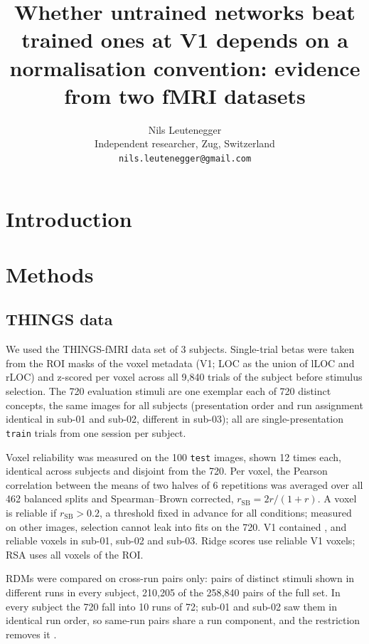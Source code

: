 \documentclass[10pt]{article}
\title{Whether untrained networks beat trained ones at V1 depends on a normalisation convention: evidence from two fMRI datasets}
\author{Nils Leutenegger\\Independent researcher, Zug, Switzerland\\\texttt{nils.leutenegger@gmail.com}}
\date{}
\begin{document}
\maketitle

\begin{abstract}

\end{abstract}

\section{Introduction}


\section{Methods}
\subsection{THINGS data}
\label{sec:data}

We used the THINGS-fMRI data set \citep{hebart2023} of 3 subjects. Single-trial
betas were taken from the ROI masks of the voxel metadata (V1; LOC as the union of lLOC
and rLOC) and z-scored per voxel across all 9{,}840 trials of the subject before stimulus
selection. The 720 evaluation stimuli are one exemplar each of 720 distinct concepts,
the same images for all subjects (presentation order and run assignment identical in sub-01 and
sub-02, different in sub-03); all are single-presentation \texttt{train} trials
from one session per subject.

Voxel reliability was measured on the 100 \texttt{test} images, shown 12 times each,
identical across subjects and disjoint from the 720. Per voxel, the Pearson
correlation between the means of two halves of 6 repetitions was averaged over all 462
balanced splits and Spearman--Brown corrected, $r_{\mathrm{SB}} = 2r/(1+r)$. A voxel is
reliable if $r_{\mathrm{SB}} > 0.2$, a threshold fixed in advance for all conditions;
measured on other images, selection cannot leak into fits on the 720. V1 contained \NReliableSubOne,
\NReliableSubTwo{} and \NReliableSubThree{} reliable voxels in sub-01, sub-02 and
sub-03. Ridge scores use reliable V1 voxels; RSA uses all voxels of the ROI.

RDMs were compared on cross-run pairs only: pairs of distinct stimuli shown in different
runs in every subject, 210{,}205 of the 258{,}840 pairs of the full set. In every subject
the 720 fall into 10 runs of 72; sub-01 and sub-02 saw them in identical run order, so
same-run pairs share a run component, and the restriction removes it \citep{evalres}.
\end{document}
